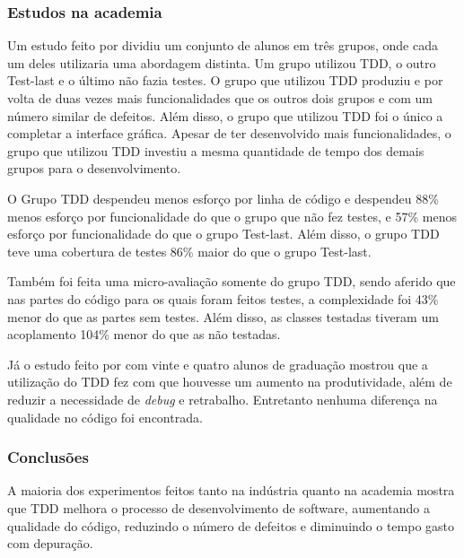 
\subsubsection{Estudos na academia} %
\label{sub:estudos_na_academia}

Um estudo feito por  dividiu um conjunto de alunos em três grupos, onde cada um deles utilizaria uma abordagem distinta. Um grupo utilizou TDD, o outro Test-last e o último não fazia testes. O grupo que utilizou TDD produziu e por volta de duas vezes  mais funcionalidades que os outros dois grupos e com um número similar de defeitos. Além disso, o grupo que utilizou TDD foi o único a completar a interface gráfica. Apesar de ter desenvolvido mais funcionalidades, o grupo que utilizou TDD investiu a mesma quantidade de tempo dos demais grupos para o desenvolvimento.

O Grupo TDD despendeu menos esforço por linha de código e despendeu 88\% menos esforço por funcionalidade do que o grupo que não fez testes, e 57\% menos esforço por funcionalidade do que o grupo Test-last. Além disso, o grupo TDD teve uma cobertura de testes 86\% maior do que o grupo Test-last.

Também foi feita uma micro-avaliação somente do grupo TDD, sendo aferido que nas partes do código para os quais foram feitos testes, a complexidade foi 43\% menor do que as partes sem testes. Além disso, as classes testadas tiveram um acoplamento 104\% menor do que as não testadas.

Já o estudo feito por  com vinte e quatro alunos de graduação mostrou que a utilização do TDD fez com que houvesse um aumento na produtividade, além de reduzir a necessidade de \textit{debug} e retrabalho. Entretanto nenhuma diferença na qualidade no código foi encontrada.


\subsubsection{Conclusões} %
\label{sub:conclusoes}

A maioria dos experimentos feitos tanto na indústria quanto na academia mostra que TDD melhora o processo de desenvolvimento de software, aumentando a qualidade do código, reduzindo o número de defeitos e diminuindo o tempo gasto com depuração.

